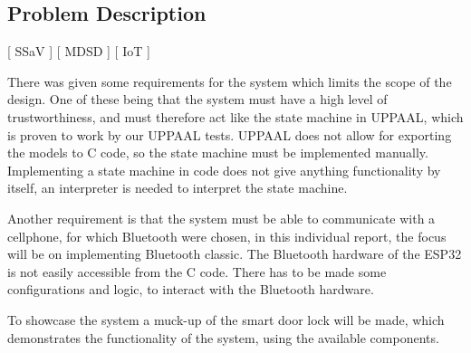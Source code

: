 \subsection{Problem Description}
[ SSaV ] [ MDSD ] [ IoT ] 
\newline


There was given some requirements for the system which limits the scope of the design.
One of these being that the system must have a high level of trustworthiness, and must therefore act like the state machine in UPPAAL, which is proven to work by our UPPAAL tests.
UPPAAL does not allow for exporting the models to C code, so the state machine must be implemented manually.
Implementing a state machine in code does not give anything functionality by itself, an interpreter is needed to interpret the state machine.

Another requirement is that the system must be able to communicate with a cellphone, for which Bluetooth were chosen, in this individual report, the focus will be on implementing Bluetooth classic.
The Bluetooth hardware of the ESP32 is not easily accessible from the C code.
There has to be made some configurations and logic, to interact with the Bluetooth hardware.

To showcase the system a muck-up of the smart door lock will be made, which demonstrates the functionality of the system, using the available components.